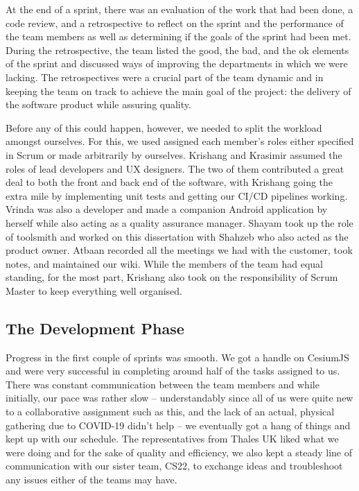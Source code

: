 \documentclass{l3proj}
\begin{document}
At the end of a sprint, there was an evaluation of the work that had been done, a code review\cite{coder}, and a retrospective\cite{retro} to reflect on the sprint and the performance of the team members as well as determining if the goals of the sprint had been met. During the retrospective, the team listed the good, the bad, and the ok elements of the sprint and discussed ways of improving the departments in which we were lacking. The retrospectives were a crucial part of the team dynamic and in keeping the team on track to achieve the main goal of the project: the delivery of the software product while assuring quality.

Before any of this could happen, however, we needed to split the workload amongst ourselves. For this, we used assigned each member's roles either specified in Scrum or made arbitrarily by ourselves. Krishang and Krasimir assumed the roles of lead developers and UX designers. The two of them contributed a great deal to both the front and back end of the software, with Krishang going the extra mile by implementing unit tests and getting our CI/CD pipelines working. Vrinda was also a developer and made a companion Android application by herself while also acting as a quality assurance manager. Shayam took up the role of toolsmith and worked on this dissertation with Shahzeb who also acted as the product owner. Atbaan recorded all the meetings we had with the customer, took notes, and maintained our wiki. While the members of the team had equal standing, for the most part, Krishang also took on the responsibility of Scrum Master\cite{scrumM} to keep everything well organised.

\subsection{The Development Phase}

Progress in the first couple of sprints was smooth. We got a handle on CesiumJS and were very successful in completing around half of the tasks assigned to us. There was constant communication between the team members and while initially, our pace was rather slow – understandably since all of us were quite new to a collaborative assignment such as this, and the lack of an actual, physical gathering due to COVID-19 didn’t help – we eventually got a hang of things and kept up with our schedule. The representatives from Thales UK liked what we were doing and for the sake of quality and efficiency, we also kept a steady line of communication with our sister team, CS22, to exchange ideas and troubleshoot any issues either of the teams may have.
\end{document}
